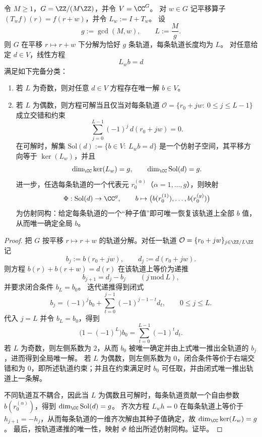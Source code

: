 \begin{theorem}[平移方程 \texorpdfstring{$(I+T_w)b=d$}{(I+T_w)b=d} 的轨道分解与解空间维数]\label{thm:fold-translation-equation-orbit-solution-space}
令 \(M\ge 1\)，\(G=\ZZ/(M\ZZ)\)，并令 \(V=\CC^{G}\)。
对 \(w\in G\) 记平移算子 \((T_w f)(r)=f(r+w)\)，并令 \(L_w:=I+T_w\)。
设
\[
g:=\gcd(M,w),\qquad L:=\frac{M}{g}.
\]
则 \(G\) 在平移 \(r\mapsto r+w\) 下分解为恰好 \(g\) 条轨道，每条轨道长度均为 \(L\)。
对任意给定 \(d\in V\)，线性方程
\[
L_w b=d
\]
满足如下完备分类：
\begin{enumerate}
\normalfont
  \item 若 \(L\) 为奇数，则对任意 \(d\in V\) 方程存在唯一解 \(b\in V\)。
  \item 若 \(L\) 为偶数，则方程可解当且仅当对每条轨道 \(\mathcal O=\{r_0+jw:\ 0\le j\le L-1\}\) 成立交错和约束
  \[
  \sum_{j=0}^{L-1}(-1)^j\,d(r_0+jw)=0.
  \]
  在可解时，解集 \(\mathrm{Sol}(d):=\{b\in V:\ L_wb=d\}\) 是一个仿射子空间，其平移方向等于 \(\ker(L_w)\)，并且
  \[
  \dim_{\CC}\ker(L_w)=g,\qquad \dim_{\CC}\mathrm{Sol}(d)=g.
  \]
  进一步，任选每条轨道的一个代表元 \(r_0^{(\alpha)}\)（\(\alpha=1,\dots,g\)），则映射
  \[
  \Phi:\mathrm{Sol}(d)\to \CC^{g},\qquad b\mapsto\bigl(b(r_0^{(1)}),\dots,b(r_0^{(g)})\bigr)
  \]
  为仿射同构：给定每条轨道的一个“种子值”即可唯一恢复该轨道上全部 \(b\) 值，从而唯一确定全局 \(b\)。
\end{enumerate}
\end{theorem}

\begin{proof}
把 \(G\) 按平移 \(r\mapsto r+w\) 的轨道分解。对任一轨道 \(\mathcal O=\{r_0+jw\}_{j\in\ZZ/L\ZZ}\) 记
\[
b_j:=b(r_0+jw),\qquad d_j:=d(r_0+jw).
\]
则方程 \(b(r)+b(r+w)=d(r)\) 在该轨道上等价为递推
\[
b_{j+1}=d_j-b_j\qquad(j\ \mathrm{mod}\ L),
\]
并要求闭合条件 \(b_L=b_0\)。
迭代递推得到闭式
\[
b_j=(-1)^j b_0+\sum_{t=0}^{j-1}(-1)^{j-1-t}d_t,\qquad 0\le j\le L.
\]
代入 \(j=L\) 并令 \(b_L=b_0\)，得到
\[
\bigl(1-(-1)^L\bigr)b_0=\sum_{t=0}^{L-1}(-1)^t d_t.
\]
若 \(L\) 为奇数，则左侧系数为 \(2\)，从而 \(b_0\) 被唯一确定并由上式唯一推出全轨道的 \(b_j\)，进而得到全局唯一解。
若 \(L\) 为偶数，则左侧系数为 \(0\)，闭合条件等价于右端交错和为 \(0\)，即所述轨道约束；并且在约束满足时 \(b_0\) 可任取，并由闭式唯一推出轨道上一条解。
\par
不同轨道互不耦合，因此当 \(L\) 为偶数且可解时，每条轨道贡献一个自由参数 \(b(r_0^{(\alpha)})\)，得到 \(\dim_{\CC}\mathrm{Sol}(d)=g\)。
齐次方程 \(L_w h=0\) 在每条轨道上等价于 \(h_{j+1}=-h_j\)，从而每条轨道的一维齐次解由其种子值确定，故 \(\dim_{\CC}\ker(L_w)=g\)。
最后，按轨道递推的唯一性，映射 \(\Phi\) 给出所述仿射同构。证毕。
\end{proof}

\endinput
